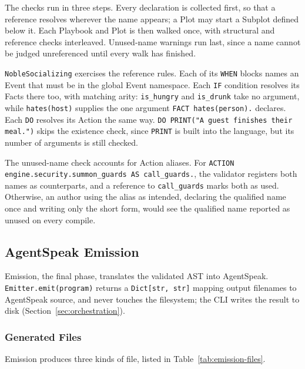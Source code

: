 The checks run in three steps. Every declaration is collected first, so that a reference resolves wherever the name appears; a Plot may start a Subplot defined below it. Each Playbook and Plot is then walked once, with structural and reference checks interleaved. Unused-name warnings run last, since a name cannot be judged unreferenced until every walk has finished.
 
\lstinline|NobleSocializing| exercises the reference rules. Each of its \lstinline|WHEN| blocks names an Event that must be in the global Event namespace. Each \lstinline|IF| condition resolves its Facts there too, with matching arity: \lstinline|is_hungry| and \lstinline|is_drunk| take no argument, while \lstinline|hates(host)| supplies the one argument \lstinline|FACT hates(person).| declares. Each \lstinline|DO| resolves its Action the same way. \lstinline|DO PRINT("A guest finishes their meal.")| skips the existence check, since \lstinline|PRINT| is built into the language, but its number of arguments is still checked.
 
The unused-name check accounts for Action aliases. For \lstinline|ACTION engine.security.summon_guards AS call_guards.|, the validator registers both names as counterparts, and a reference to \lstinline|call_guards| marks both as used. Otherwise, an author using the alias as intended, declaring the qualified name once and writing only the short form, would see the qualified name reported as unused on every compile.


\subsection{AgentSpeak Emission}
\label{sec:emission}
 
Emission, the final phase, translates the validated AST into AgentSpeak. \lstinline|Emitter.emit(program)| returns a \lstinline|Dict[str, str]| mapping output filenames to AgentSpeak source, and never touches the filesystem; the CLI writes the result to disk (Section~\ref{sec:orchestration}).
 
\subsubsection{Generated Files}
 
Emission produces three kinds of file, listed in Table~\ref{tab:emission-files}.
 
